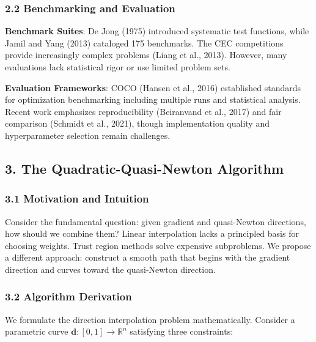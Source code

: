 \hypertarget{benchmarking-and-evaluation}{%
\subsubsection{2.2 Benchmarking and Evaluation}\label{benchmarking-and-evaluation}}

\textbf{Benchmark Suites}: De Jong (1975) introduced systematic test functions, while Jamil and Yang (2013) cataloged 175 benchmarks.
The CEC competitions provide increasingly complex problems (Liang et al., 2013).
However, many evaluations lack statistical rigor or use limited problem sets.

\textbf{Evaluation Frameworks}: COCO (Hansen et al., 2016) established standards for optimization benchmarking including multiple runs and statistical analysis.
Recent work emphasizes reproducibility (Beiranvand et al., 2017) and fair comparison (Schmidt et al., 2021), though implementation quality and hyperparameter selection remain challenges.

\hypertarget{the-quadratic-quasi-newton-algorithm}{%
\subsection{3. The Quadratic-Quasi-Newton Algorithm}\label{the-quadratic-quasi-newton-algorithm}}

\hypertarget{motivation-and-intuition}{%
\subsubsection{3.1 Motivation and Intuition}\label{motivation-and-intuition}}

Consider the fundamental question: given gradient and quasi-Newton directions, how should we combine them?
Linear interpolation lacks a principled basis for choosing weights.
Trust region methods solve expensive subproblems.
We propose a different approach: construct a smooth path that begins with the gradient direction and curves toward the quasi-Newton direction.

\hypertarget{algorithm-derivation}{%
\subsubsection{3.2 Algorithm Derivation}\label{algorithm-derivation}}

We formulate the direction interpolation problem mathematically. Consider a parametric curve
\(\mathbf{d}: [0,1] \rightarrow \mathbb{R}^n\) satisfying three constraints:

